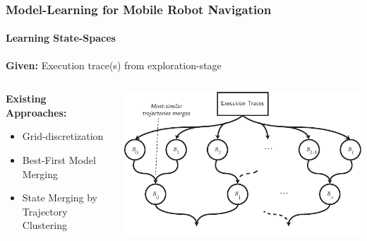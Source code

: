 \begin{frame}
	\frametitle{Model-Learning for Mobile Robot Navigation}
	\framesubtitle{Learning State-Spaces}
	\textbf{Given:} Execution trace(s) from exploration-stage
	\begin{columns}[T]
		\begin{column}{0.4\textwidth}
			\vspace{12pt}
			\textbf{Existing Approaches:}
			\begin{itemize}
				\item Grid-discretization
				\item Best-First Model Merging
				\item \textcolor{tudblue}{State Merging by Trajectory Clustering} %
			\end{itemize}
			\vspace{18pt}
			\small
		\end{column}
		\begin{column}{0.525\textwidth}
			\includegraphics[width=1.11\textwidth]{figures/model-merging-trajectory}
		\end{column}
	\end{columns}
\end{frame}

